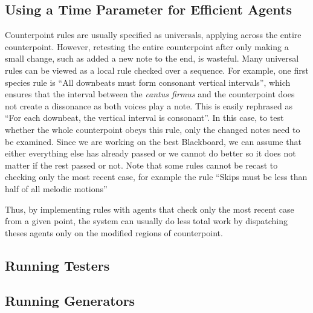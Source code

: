 \subsection{Using a Time Parameter for Efficient Agents}
Counterpoint rules are usually specified as universals, applying across the entire counterpoint.
However, retesting the entire counterpoint after only making a small change, such as added a new note to the end, is wasteful.
Many universal rules can be viewed as a local rule checked over a sequence.
For example, one first species rule is ``All downbeats must form consonant vertical intervals'', 
  which ensures that the interval between the \emph{cantus firmus} and the counterpoint does not create a dissonance as both voices play a note.
This is easily rephrased as ``For each downbeat, the vertical interval is consonant''.
In this case, to test whether the whole counterpoint obeys this rule, only the changed notes need to be examined.
Since we are working on the best Blackboard, we can assume that either everything else has already passed or 
  we cannot do better so it does not matter if the rest passed or not.
Note that some rules cannot be recast to checking only the most recent case, for example the rule ``Skips must be less than half of all melodic motions''

Thus, by implementing rules with agents that check only the most recent case from a given point, 
the system can usually do less total work by dispatching theses agents only on the modified regions of counterpoint.

\subsection{Running Testers}

\subsection{Running Generators}
